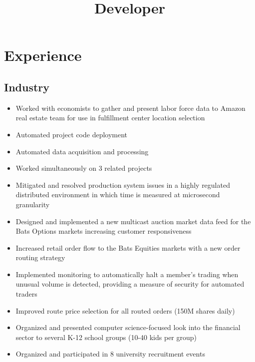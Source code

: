 \documentclass[10pt,a4paper,sans]{moderncv}        %
\title{Developer}
\begin{document}
\makecvtitle

\section{Experience}
\subsection{Industry}
\begin{itemize}
\item Worked with economists to gather and present labor force data to Amazon real estate team for use in fulfillment center location selection
\item Automated project code deployment
\item Automated data acquisition and processing
\item Worked simultaneously on 3 related projects
\makenewline
\makenewline
\end{itemize}

\begin{itemize}
\item Mitigated and resolved production system issues in a highly regulated distributed environment in which time is measured at microsecond granularity
\item Designed and implemented a new multicast auction market data feed for the Bats Options markets increasing customer responsiveness
\item Increased retail order flow to the Bats Equities markets with a new order routing strategy
\item Implemented monitoring to automatically halt a member's trading when unusual volume is detected, providing a measure of security for automated traders
\item Improved route price selection for all routed orders (150M shares daily)
\item Organized and presented computer science-focused look into the financial sector to several K-12 school groups (10-40 kids per group)
\item Organized and participated in 8 university recruitment events
\makenewline
\makenewline
\end{itemize}
\end{document}

